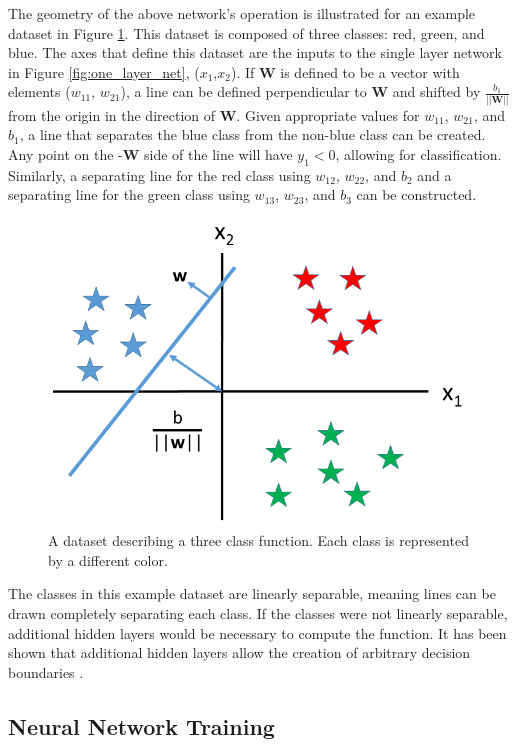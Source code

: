 The geometry of the above network's operation is illustrated for an example dataset in Figure \ref{fig:training_set_one_layer}. This dataset is composed of three classes: red, green, and blue. The axes that define this dataset are the inputs to the single layer network in Figure \ref{fig:one_layer_net}, ($x_1$,$x_2$). If $\mathbf{W}$ is defined to be a vector with elements ($w_{11}$, $w_{21}$), a line can be defined perpendicular to $\mathbf{W}$ and shifted by $\frac{b_1}{||\mathbf{W}||}$ from the origin in the direction of $\mathbf{W}$. Given appropriate values for $w_{11}$, $w_{21}$, and $b_1$, a line that separates the blue class from the non-blue class can be created. Any point on the -$\mathbf{W}$ side of the line will have $y_1 < 0$, allowing for classification. Similarly, a separating line for the red class using $w_{12}$, $w_{22}$, and $b_2$ and a separating line for the green class using $w_{13}$, $w_{23}$, and $b_3$ can be constructed. 
\begin{figure}[H]
	\centering
	\includegraphics[width=0.65\linewidth]{images/training_set_for_single_layer_hyperplane_v2}
	\caption{A dataset describing a three class function. Each class is represented by a different color.}
	\label{fig:training_set_one_layer}
\end{figure}

The classes in this example dataset are linearly separable, meaning lines can be drawn completely separating each class. If the classes were not linearly separable, additional hidden layers would be necessary to compute the function. It has been shown that additional hidden layers allow the creation of arbitrary decision boundaries \cite{Hornik1991}. 

\subsection{Neural Network Training}

